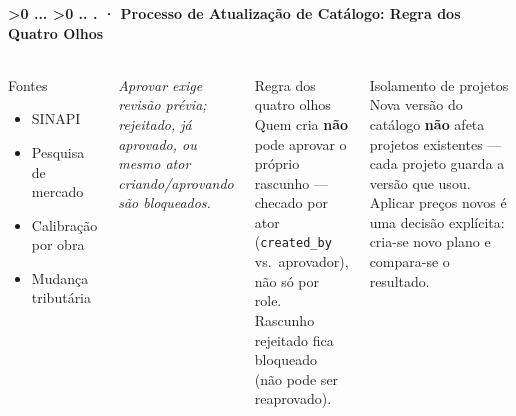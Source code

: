 \documentclass[aspectratio=169,10pt]{beamer}
\newcounter{mlc3}[subsection]
\newcounter{mlc4}[mlc3]
\newcommand{\pathnum}{%
  \ifnum\value{mlc4}>0
    \thesection.\thesubsection.\arabic{mlc3}.\arabic{mlc4}%
  \else\ifnum\value{mlc3}>0
    \thesection.\thesubsection.\arabic{mlc3}%
  \else
    \thesection.\thesubsection%
  \fi\fi
}
\newcommand{\lvlA}{\stepcounter{mlc3}}   %
\newcommand{\mtitle}[1]{%
  \frametitle{\insertsection}%
  \framesubtitle{\pathnum\;·\; #1}}
\begin{document}
\lvlA
\begin{frame}
  \mtitle{Processo de Atualização de Catálogo: Regra dos Quatro Olhos}
  \begin{columns}[T]
    \begin{block}{Fontes}
      \begin{itemize}\scriptsize
        \item SINAPI
        \item Pesquisa de mercado
        \item Calibração por obra
        \item Mudança tributária
      \end{itemize}
    \end{block}
    \begin{minipage}{0.9\linewidth}
      \raggedright\tiny\itshape Aprovar exige
      revisão prévia; rejeitado, já aprovado, ou mesmo ator
      criando/aprovando são bloqueados.
    \end{minipage}
    \begin{alertblock}{\small Regra dos quatro olhos}
      \scriptsize Quem cria \textbf{não} pode aprovar o próprio rascunho ---
      checado por ator (\texttt{created\_by} vs.\ aprovador), não só por
      role.\\
      Rascunho rejeitado fica bloqueado (não pode ser reaprovado).
    \end{alertblock}
    \vspace{4pt}
    \begin{exampleblock}{\small Isolamento de projetos}
      \scriptsize Nova versão do catálogo \textbf{não} afeta projetos
      existentes --- cada projeto guarda a versão que usou. Aplicar
      preços novos é uma decisão explícita: cria-se novo plano e
      compara-se o resultado.
    \end{exampleblock}
  \end{columns}
\end{frame}
\end{document}
